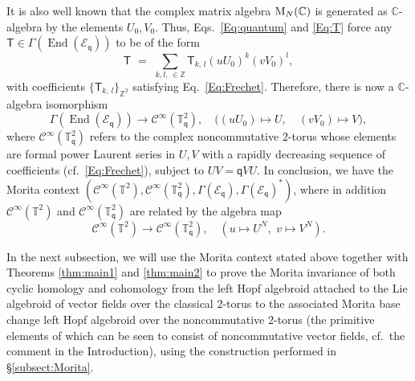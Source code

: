 \documentclass[reqno, a4paper, 10pt]{amsart}
\numberwithin{equation}{section}
\theoremstyle{plain}
\theoremstyle{definition}
\theoremstyle{remark}
\begin{document}
It is also well known that the complex matrix algebra ${\rm M}_N(\mathbb{C})$ is generated as $\mathbb{C}$-algebra by the elements $U_0, V_0$. 
Thus, Eqs.~\eqref{Eq:quantum} and \eqref{Eq:T} force any ${\mathsf{{T}}} \in \Gamma({\operatorname{End}({{{\mathcal E}}_{{\mathsf{{q}}}}})})$ to be of the form 
$$ 
{\mathsf{{T}}} \,\, =\,\, \sum_{k,l,\, \in \mathbb{Z}} {\mathsf{{T}}}_{k,\, l}(uU_0)^k(vV_0)^l ,
$$ 
with coefficients $\{  {\mathsf{{T}}}_{k,\, l}\}_{\mathbb{Z}^2}$ satisfying Eq.~\eqref{Eq:Frechet}. 
Therefore, there is now a $\mathbb{C}$-algebra isomorphism
\begin{equation*}
\label{Eq:nocom torus}
\Gamma({\operatorname{End}({{{\mathcal E}}_{{\mathsf{{q}}}}})}) \to  {{\mathcal C}}^{\infty}(\mathbb{T}^2_{{\mathsf{{q}}}}),  \quad 
\big( (uU_0) \mapsto  U, \quad (vV_0) \mapsto V\big),
\end{equation*}
where ${{\mathcal C}}^{\infty}(\mathbb{T}^2_{{\mathsf{{q}}}})$ refers to the complex noncommutative $2$-torus whose elements are formal power Laurent series in $U, V$ with a rapidly decreasing sequence of coefficients (cf.~\eqref{Eq:Frechet}), subject to $UV = {\mathsf{{q}}} VU$. 
In conclusion, we have the 
Morita context $({{\mathcal C}}^{\infty}(\mathbb{T}^2), {{\mathcal C}}^{\infty}(\mathbb{T}_{{\mathsf{{q}}}}^2), \Gamma({{\mathcal E}}_{{\mathsf{{q}}}}), \Gamma({{\mathcal E}}_{{\mathsf{{q}}}})^*)$, where in addition 
${{\mathcal C}}^{\infty}(\mathbb{T}^2)$ and ${{\mathcal C}}^{\infty}(\mathbb{T}_{{\mathsf{{q}}}}^2)$ are related by the algebra map
$$
{{\mathcal C}}^{\infty}(\mathbb{T}^2) \longrightarrow  {{\mathcal C}}^{\infty}(\mathbb{T}_{{\mathsf{{q}}}}^2), \quad( u \mapsto U^N, \,\, v \mapsto V^N).
$$

In the next subsection, we will use the Morita context stated above 
together with Theorems \ref{thm:main1}  and \ref{thm:main2} to prove the Morita invariance of both cyclic homology and  cohomology from the left Hopf algebroid attached to the Lie algebroid of vector fields over the classical $2$-torus to the associated Morita base change left Hopf algebroid over the noncommutative $2$-torus (the primitive elements of which can be seen to consist of noncommutative vector fields, cf.\ the comment in the Introduction), using the construction performed in  \S\ref{subsect:Morita}. 
\end{document}
